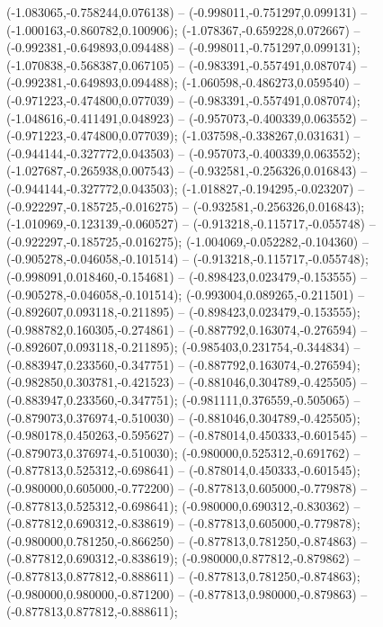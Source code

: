  (-1.083065,-0.758244,0.076138) -- (-0.998011,-0.751297,0.099131) -- (-1.000163,-0.860782,0.100906);
 (-1.078367,-0.659228,0.072667) -- (-0.992381,-0.649893,0.094488) -- (-0.998011,-0.751297,0.099131);
 (-1.070838,-0.568387,0.067105) -- (-0.983391,-0.557491,0.087074) -- (-0.992381,-0.649893,0.094488);
 (-1.060598,-0.486273,0.059540) -- (-0.971223,-0.474800,0.077039) -- (-0.983391,-0.557491,0.087074);
 (-1.048616,-0.411491,0.048923) -- (-0.957073,-0.400339,0.063552) -- (-0.971223,-0.474800,0.077039);
 (-1.037598,-0.338267,0.031631) -- (-0.944144,-0.327772,0.043503) -- (-0.957073,-0.400339,0.063552);
 (-1.027687,-0.265938,0.007543) -- (-0.932581,-0.256326,0.016843) -- (-0.944144,-0.327772,0.043503);
 (-1.018827,-0.194295,-0.023207) -- (-0.922297,-0.185725,-0.016275) -- (-0.932581,-0.256326,0.016843);
 (-1.010969,-0.123139,-0.060527) -- (-0.913218,-0.115717,-0.055748) -- (-0.922297,-0.185725,-0.016275);
 (-1.004069,-0.052282,-0.104360) -- (-0.905278,-0.046058,-0.101514) -- (-0.913218,-0.115717,-0.055748);
 (-0.998091,0.018460,-0.154681) -- (-0.898423,0.023479,-0.153555) -- (-0.905278,-0.046058,-0.101514);
 (-0.993004,0.089265,-0.211501) -- (-0.892607,0.093118,-0.211895) -- (-0.898423,0.023479,-0.153555);
 (-0.988782,0.160305,-0.274861) -- (-0.887792,0.163074,-0.276594) -- (-0.892607,0.093118,-0.211895);
 (-0.985403,0.231754,-0.344834) -- (-0.883947,0.233560,-0.347751) -- (-0.887792,0.163074,-0.276594);
 (-0.982850,0.303781,-0.421523) -- (-0.881046,0.304789,-0.425505) -- (-0.883947,0.233560,-0.347751);
 (-0.981111,0.376559,-0.505065) -- (-0.879073,0.376974,-0.510030) -- (-0.881046,0.304789,-0.425505);
 (-0.980178,0.450263,-0.595627) -- (-0.878014,0.450333,-0.601545) -- (-0.879073,0.376974,-0.510030);
 (-0.980000,0.525312,-0.691762) -- (-0.877813,0.525312,-0.698641) -- (-0.878014,0.450333,-0.601545);
 (-0.980000,0.605000,-0.772200) -- (-0.877813,0.605000,-0.779878) -- (-0.877813,0.525312,-0.698641);
 (-0.980000,0.690312,-0.830362) -- (-0.877812,0.690312,-0.838619) -- (-0.877813,0.605000,-0.779878);
 (-0.980000,0.781250,-0.866250) -- (-0.877813,0.781250,-0.874863) -- (-0.877812,0.690312,-0.838619);
 (-0.980000,0.877812,-0.879862) -- (-0.877813,0.877812,-0.888611) -- (-0.877813,0.781250,-0.874863);
 (-0.980000,0.980000,-0.871200) -- (-0.877813,0.980000,-0.879863) -- (-0.877813,0.877812,-0.888611);
